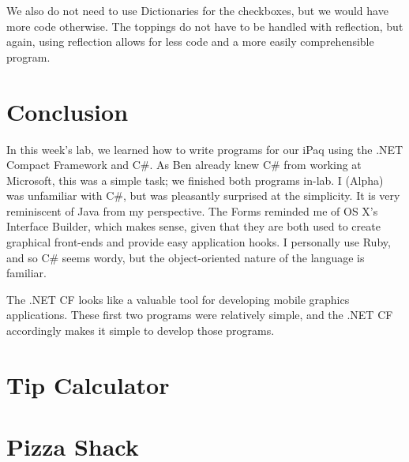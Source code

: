 \documentclass[11pt]{article}
\begin{document}
We also do not need to use Dictionaries for the checkboxes, but we would have more code otherwise. The toppings do not have to be handled with reflection, but again, using reflection allows for less code and a more easily comprehensible program.

\newpage
\section{Conclusion}

In this week's lab, we learned how to write programs for our iPaq using the .NET Compact Framework and C\#. As Ben already knew C\# from working at Microsoft, this was a simple task; we finished both programs in-lab. I (Alpha) was unfamiliar with C\#, but was pleasantly surprised at the simplicity. It is very reminiscent of Java from my perspective. The Forms reminded me of OS X's Interface Builder, which makes sense, given that they are both used to create graphical front-ends and provide easy application hooks. I personally use Ruby, and so C\# seems wordy, but the object-oriented nature of the language is familiar.

The .NET CF looks like a valuable tool for developing mobile graphics applications. These first two programs were relatively simple, and the .NET CF accordingly makes it simple to develop those programs.

\appendix

\newpage
\section{Tip Calculator}
\label{tip-code}



\newpage
\section{Pizza Shack}
\label{pizza-code}


\end{document}
